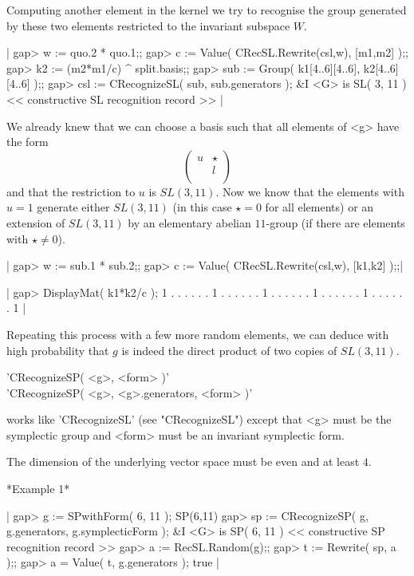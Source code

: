Computing another  element in the kernel   we try to recognise  the group
generated by these two elements restricted to the invariant subspace $W$.

|    gap> w := quo.2 * quo.1;;
    gap> c := Value( CRecSL.Rewrite(csl,w), [m1,m2] );;
    gap> k2 := (m2*m1/c) ^ split.basis;;
    gap> sub := Group( k1{[4..6]}{[4..6]}, k2{[4..6]}{[4..6]} );;
    gap> csl := CRecognizeSL( sub, sub.generators );
    &I  <G> is SL( 3, 11 )
    << constructive SL recognition record >> |

We already knew that we can choose a basis  such that all elements of <g>
have the form
$$
\left(\begin{array}{cc}
  u & \star \\
    & l \\
\end{array}\right)
$$
and that  the  restriction to $u$ is   $SL(3,11)$.  Now we  know that the
elements with $u =  1$ generate either  $SL(3,11)$ (in this case $\star =
0$ for  all elements)  or  an  extension of  $SL(3,11)$ by  an elementary
abelian $11$-group (if there are elements with $\star \neq 0$).

|    gap> w := sub.1 * sub.2;;
    gap> c := Value( CRecSL.Rewrite(csl,w), [k1,k2] );;|

\vbox{
|    gap> DisplayMat( k1*k2/c );
      1  .  .  .  .  .
      .  1  .  .  .  .
      .  .  1  .  .  .
      .  .  .  1  .  .
      .  .  .  .  1  .
      .  .  .  .  .  1 |
}

Repeating this process with a  few more  random  elements, we can  deduce
with  high  probability  that $g$ is   indeed  the direct  product of two
copies of $SL(3,11)$.



'CRecognizeSP( <g>, <form> )'\\
'CRecognizeSP( <g>, <g>.generators, <form> )'

works like 'CRecognizeSL' (see  "CRecognizeSL")  except that <g>  must be
the symplectic group and <form> must be an invariant symplectic form.

The dimension  of the underlying vector space  must be even  and at least
$4$.

*Example 1*

|    gap> g := SPwithForm( 6, 11 );
    SP(6,11)
    gap> sp := CRecognizeSP( g, g.generators, g.symplecticForm );              
    &I  <G> is SP( 6, 11 )
    << constructive SP recognition record >>
    gap> a := RecSL.Random(g);;
    gap> t := Rewrite( sp, a );;
    gap> a = Value( t, g.generators );
    true |



